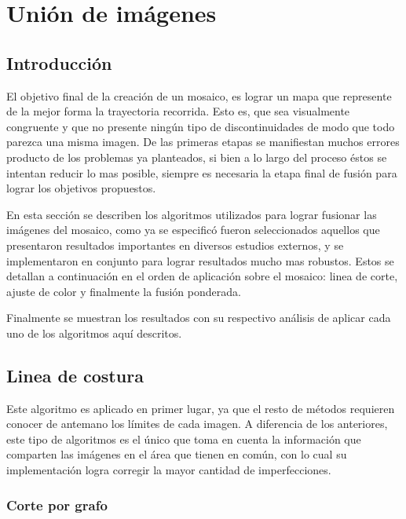 \chapter{Unión de imágenes}
\label{capitulo5}


\section{Introducción}
El objetivo final de la creación de un mosaico, es lograr un mapa que represente de la mejor forma la trayectoria recorrida. Esto es, que sea visualmente congruente y que no presente ningún tipo de discontinuidades de modo que todo parezca una misma imagen. De las primeras etapas se manifiestan muchos errores producto de los problemas ya planteados, si bien a lo largo del proceso éstos se intentan reducir lo mas posible, siempre es necesaria la etapa final de fusión para lograr los objetivos propuestos.

En esta sección se describen los algoritmos utilizados para lograr fusionar las imágenes del mosaico, como ya se especificó fueron seleccionados aquellos que presentaron resultados importantes en diversos estudios externos, y se implementaron en conjunto para lograr resultados mucho mas robustos. Estos se detallan a continuación en el orden de aplicación sobre el mosaico: linea de corte, ajuste de color y finalmente la fusión ponderada.

Finalmente se muestran los resultados con su respectivo análisis de aplicar cada uno de los algoritmos aquí descritos.
\clearpage


\section{Linea de costura}
Este algoritmo es aplicado en primer lugar, ya que el resto de métodos requieren conocer de antemano los límites de cada imagen. 
A diferencia de los anteriores, este tipo de algoritmos es el único que toma en cuenta la información que comparten las imágenes en el área que tienen en común, con lo cual su implementación logra corregir la mayor cantidad de imperfecciones. 


\subsection{Corte por grafo}

